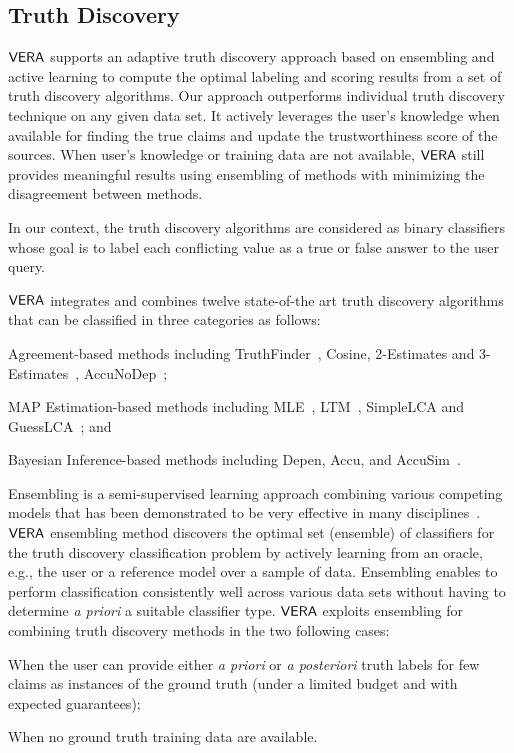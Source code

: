 \subsection{Truth Discovery}\label{truthfinding}
$\mathsf{VERA}$ supports an adaptive truth discovery approach based on ensembling and active learning to compute the optimal labeling and scoring results from a set of truth discovery algorithms. Our approach outperforms individual truth discovery technique on any given data set. It actively leverages the user's knowledge when available for finding the true claims and update the trustworthiness score of the sources. When user's knowledge or training data are not available, $\mathsf{VERA}$ still provides meaningful results using ensembling of methods with minimizing the disagreement between methods.

In our context, the truth discovery algorithms are considered as  binary classifiers whose goal is to label each conflicting value as a true or false answer to the user query.

$\mathsf{VERA}$ integrates and combines  twelve state-of-the art truth discovery algorithms that can be classified in three categories as follows:
\begin{inparaenum}[(1)]
\item Agreement-based methods including  TruthFinder~\cite{YinHY08}, Cosine, 2-Estimates and 3-Estimates~\cite{GallandAMS10}, AccuNoDep~\cite{DongBS09}; 
\item MAP Estimation-based methods including  MLE~\cite{WangKLA12}, LTM~\cite{ZhaoRGH12}, SimpleLCA and GuessLCA~\cite{PasternackR13}; and
 \item Bayesian Inference-based methods including  Depen, Accu, and AccuSim~\cite{DongBS09}.
\end{inparaenum}



\label{ensembling} Ensembling is a semi-supervised learning approach  combining various competing models that has been demonstrated to be very effective in many disciplines~\cite{Burr12}. $\mathsf{VERA}$ ensembling method discovers the optimal set (ensemble) of classifiers for the truth discovery classification problem by actively learning from an oracle, e.g., the user or a reference model over a sample of data. Ensembling  enables to perform
classification consistently well across various data sets without having to determine \emph{a priori} a suitable classifier 
type.  $\mathsf{VERA}$ exploits ensembling for combining truth discovery methods in the two following cases:
\begin{inparaenum}[(1)]
\item  When the user can provide either \emph{a priori} or \emph{a posteriori} truth labels for few claims as instances of the ground truth (under a limited budget and with expected guarantees); 
\item When no ground truth training data are available.
\end{inparaenum}

